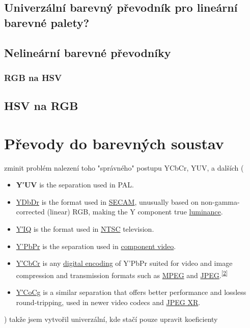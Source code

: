 \documentclass[FM,DP]{tulthesis}
\begin{document}
\subsection{Univerzální barevný převodník pro lineární barevné palety?}

\subsection{Nelineární barevné převodníky}
\subsubsection{RGB na HSV}
\subsection{HSV na RGB}

\section{Převody do barevných soustav}
zminit problém nalezení toho "správného" postupu YCbCr, YUV, a dalších (
\begin{itemize}
    \item \textbf{Y′UV} is the separation used in PAL.
    \item \href{https://en.wikipedia.org/wiki/YDbDr}{YDbDr} is the format used in \href{https://en.wikipedia.org/wiki/SECAM}{SECAM}, unusually based on non-gamma-corrected (linear) RGB, making the Y component true \href{https://en.wikipedia.org/wiki/Luminance}{luminance}.
    \item \href{https://en.wikipedia.org/wiki/YIQ}{Y′IQ} is the format used in \href{https://en.wikipedia.org/wiki/NTSC}{NTSC} television.
    \item \href{https://en.wikipedia.org/wiki/YPbPr}{Y'PbPr} is the separation used in \href{https://en.wikipedia.org/wiki/Component_video}{component video}.
    \item \href{https://en.wikipedia.org/wiki/YCbCr}{Y′CbCr} is any \href{https://en.wikipedia.org/wiki/Digital_component_video}{digital encoding} of Y'PbPr suited for video and image compression and transmission formats such as \href{https://en.wikipedia.org/wiki/Moving_Picture_Experts_Group}{MPEG} and \href{https://en.wikipedia.org/wiki/JPEG}{JPEG}.\textsuperscript{\href{https://en.wikipedia.org/wiki/Y\%E2\%80\%B2UV\#cite_note-Poynton-2}{[2]}}
    \item \href{https://en.wikipedia.org/wiki/YCoCg}{Y′CoCg} is a similar separation that offers better performance and lossless round-tripping, used in newer video codecs and \href{https://en.wikipedia.org/wiki/JPEG_XR}{JPEG XR}.
\end{itemize}
) takže jsem vytvořil univerzální, kde stačí pouze upravit koeficienty
\end{document}
